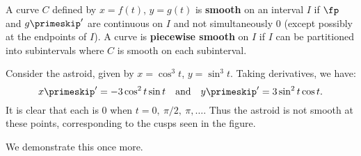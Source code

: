 
{A curve $C$ defined by $x=f(t)$, $y=g(t)$ is \textbf{smooth} on an interval $I$ if $\fp$ and $g\primeskip'$ are continuous on $I$ and not simultaneously 0 (except possibly at the endpoints of $I$). A curve is \textbf{piecewise smooth} on $I$ if $I$ can be partitioned into subintervals where $C$ is smooth on each subinterval.
}

Consider the astroid, given by $x=\cos^3t$, $y=\sin^3t$. Taking derivatives, we have:
$$x\primeskip' = -3\cos^2t\sin t\quad \text{and}\quad y\primeskip' = 3\sin^2t\cos t.$$
It is clear that each is 0 when $t=0,\ \pi/2,\ \pi,\ldots$. Thus the astroid is not smooth at these points, corresponding to the cusps seen in the figure.


We demonstrate this once more.\\

